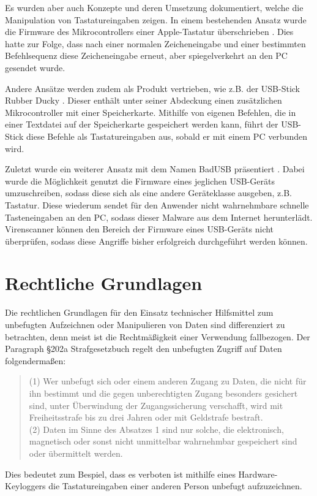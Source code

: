 Es wurden aber auch Konzepte und deren Umsetzung dokumentiert, welche die Manipulation von Tastatureingaben zeigen. In einem bestehenden Ansatz wurde die Firmware des Mikrocontrollers einer Apple-Tastatur überschrieben \cite{chen}. Dies hatte zur Folge, dass nach einer normalen Zeicheneingabe und einer bestimmten Befehlsequenz diese Zeicheneingabe erneut, aber spiegelverkehrt an den PC gesendet wurde.

Andere Ansätze werden zudem als Produkt vertrieben, wie z.B. der USB-Stick Rubber Ducky \cite{ducky}. Dieser enthält unter seiner Abdeckung einen zusätzlichen Mikrocontroller mit einer Speicherkarte. Mithilfe von eigenen Befehlen, die in einer Textdatei auf der Speicherkarte gespeichert werden kann, führt der USB-Stick diese Befehle als Tastatureingaben aus, sobald er mit einem PC verbunden wird.

Zuletzt wurde ein weiterer Ansatz mit dem Namen BadUSB präsentiert \cite{badusb}. Dabei wurde die Möglichkeit genutzt die Firmware eines jeglichen USB-Geräts umzuschreiben, sodass diese sich als eine andere Geräteklasse ausgeben, z.B. Tastatur. Diese wiederum sendet für den Anwender nicht wahrnehmbare schnelle Tasteneingaben an den PC, sodass dieser Malware aus dem Internet herunterlädt. Virenscanner können den Bereich der Firmware eines USB-Geräts nicht überprüfen, sodass diese Angriffe bisher erfolgreich durchgeführt werden können.



\section{Rechtliche Grundlagen}
Die rechtlichen Grundlagen für den Einsatz technischer Hilfsmittel zum unbefugten Aufzeichnen oder Manipulieren von Daten sind differenziert zu betrachten, denn meist ist die Rechtmäßigkeit einer Verwendung fallbezogen. Der Paragraph \S 202a Strafgesetzbuch \cite{stgb} regelt den unbefugten Zugriff auf Daten folgendermaßen:
\begin{quote}
  (1) Wer unbefugt sich oder einem anderen Zugang zu Daten, die nicht für ihn bestimmt und die gegen unberechtigten Zugang besonders gesichert sind, unter Überwindung der Zugangssicherung verschafft, wird mit Freiheitsstrafe bis zu drei Jahren oder mit Geldstrafe bestraft. \\
  (2) Daten im Sinne des Absatzes 1 sind nur solche, die elektronisch, magnetisch oder sonst nicht unmittelbar wahrnehmbar gespeichert sind oder übermittelt werden.
\end{quote}
Dies bedeutet zum Bespiel, dass es verboten ist mithilfe eines Hardware-Keyloggers die Tastatureingaben einer anderen Person unbefugt aufzuzeichnen.


